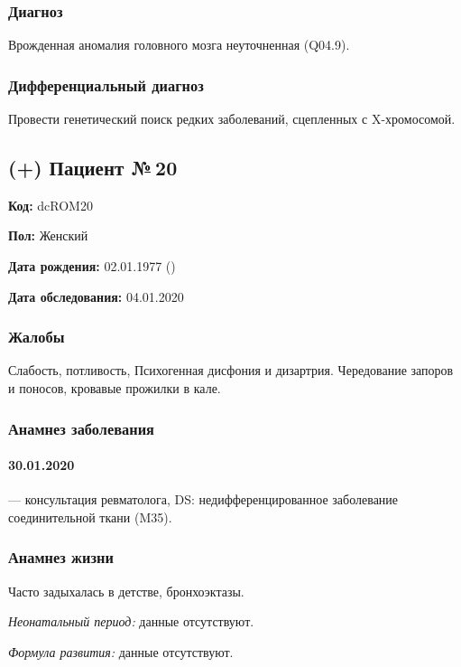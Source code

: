 \documentclass[a4paper,14pt]{extarticle}
\begin{document}
\subsubsection*{Диагноз}

Врожденная аномалия головного мозга неуточненная (Q04.9).

\subsubsection*{Дифференциальный диагноз}

Провести генетический поиск редких заболеваний, сцепленных с X-хромосомой.

\newpage
\subsection*{(+) Пациент №\,20}

\textbf{Код:} dcROM20

\textbf{Пол:} Женский

\textbf{Дата рождения:} 02.01.1977 ()

\textbf{Дата обследования:} 04.01.2020

\subsubsection*{Жалобы}

Слабость, потливость, Психогенная дисфония и дизартрия. Чередование запоров и поносов, кровавые прожилки в кале.

\subsubsection*{Анамнез заболевания}

\paragraph{30.01.2020} --- консультация ревматолога, DS: недифференцированное заболевание соединительной ткани (M35).

\subsubsection*{Анамнез жизни}

Часто задыхалась в детстве, бронхоэктазы.

\emph{Неонатальный период:} данные отсутствуют.

\emph{Формула развития:} данные отсутствуют.
\end{document}

